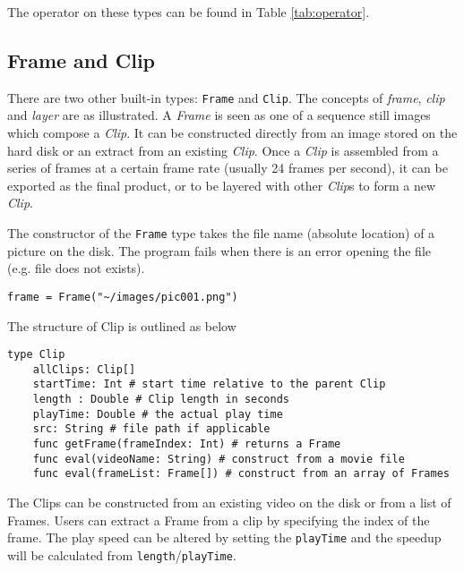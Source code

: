 \documentclass[12pt]{article}
\begin{document}
The operator on these types can be found in Table \ref{tab:operator}.

\subsection{Frame and Clip}
There are two other built-in types: \texttt{Frame} and \texttt{Clip}. The concepts of \textit{frame}, \textit{clip} and \textit{layer} are as illustrated. A \textit{Frame} is seen as one of a sequence still images which compose a \textit{Clip}. It can be constructed directly from an image stored on the hard disk or an extract from an existing \textit{Clip}. Once a \textit{Clip} is assembled from a series of frames at a certain frame rate (usually 24 frames per second), it can be exported as the final product, or to be layered with other \textit{Clip}s to form a new \textit{Clip}.

The constructor of the \texttt{Frame} type takes the file name (absolute location) of a picture on the disk. The program fails when there is an error opening the file (e.g. file does not exists).

\begin{lstlisting}[caption=Frame Instantiation]
  frame = Frame("~/images/pic001.png")
\end{lstlisting}

The structure of Clip is outlined as below
\begin{mdframed}[backgroundcolor=lightgray,hidealllines=true]
\begin{verbatim}
type Clip
    allClips: Clip[]
    startTime: Int # start time relative to the parent Clip
    length : Double # Clip length in seconds
    playTime: Double # the actual play time
    src: String # file path if applicable
    func getFrame(frameIndex: Int) # returns a Frame
    func eval(videoName: String) # construct from a movie file
    func eval(frameList: Frame[]) # construct from an array of Frames
\end{verbatim}
\end{mdframed}

The Clips can be constructed from an existing video on the disk or from a list of Frames. Users can extract a Frame from a clip by specifying the index of the frame. The play speed can be altered by setting the \texttt{playTime} and the speedup will be calculated from  \texttt{length}/\texttt{playTime}.
\end{document}
